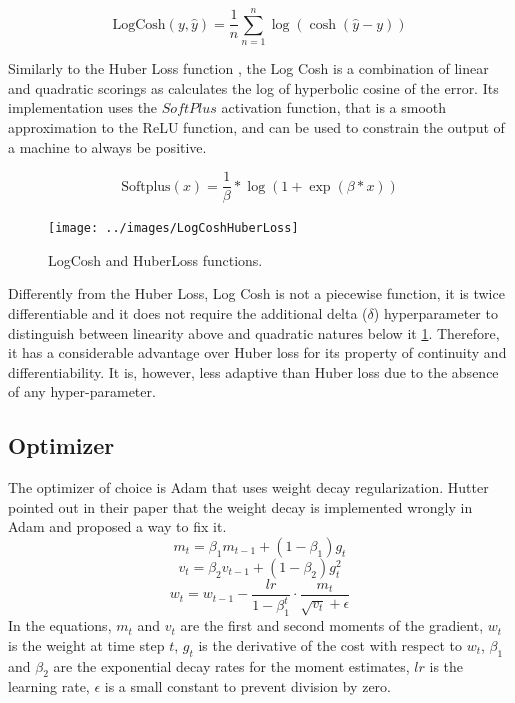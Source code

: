 \begin{equation}
\label{eq:logcosh}
    \text{LogCosh}(y, \hat{y}) = \frac{1}{n} \sum_{n = 1}^{n} \log(\cosh(\hat{y} - y))
\end{equation}

Similarly to the Huber Loss function \cite{huber1964robust}, the Log Cosh is a combination of linear and quadratic scorings as calculates the log of hyperbolic cosine of the error.
Its implementation uses the $SoftPlus$ activation function, that is a smooth approximation to the ReLU function, and can be used to constrain the output of a machine to always be positive.

\begin{equation}
    \label{eq:softplus}
    \text{Softplus}(x) = \frac{1}{\beta} \ast \log(1 + \exp(\beta \ast x))
\end{equation}

\begin{figure}[t!]
    \texttt{[image: ../images/LogCoshHuberLoss]}
    \caption{LogCosh and HuberLoss functions.}
    \label{fig:LogCoshHuberLoss}
    \centering
\end{figure}
Differently from the Huber Loss, Log Cosh is not a piecewise function, it is twice differentiable and it does not require the additional delta ($\delta$) hyperparameter to distinguish between linearity above and quadratic natures below it \ref{fig:LogCoshHuberLoss}.
Therefore, it has a considerable advantage over Huber loss for its property of continuity and differentiability.
It is, however, less adaptive than Huber loss due to the absence of any hyper-parameter.


\subsection{Optimizer}
\label{subsec:optimizer}

The optimizer of choice is Adam \cite{kingma2017adam} that uses weight decay regularization.
Hutter pointed out in their paper \cite{loshchilov2019decoupled} that the weight decay is implemented wrongly in Adam and proposed a way to fix it.
\begin{equation}
\label{eq:first_moment}
m_t = \beta_1 m_{t-1} + (1 - \beta_1) g_t
\end{equation}
\begin{equation}
\label{eq:second_moment}
v_t = \beta_2 v_{t-1} + (1 - \beta_2) g_t^2
\end{equation}
\begin{equation}
\label{eq:weight_update}
w_t = w_{t-1} - \frac{lr}{1 - \beta_1^t} \cdot \frac{m_t}{\sqrt{v_t} + \epsilon}
\end{equation}
In the equations, $m_t$ and $v_t$ are the first and second moments of the gradient, $w_t$ is the weight at time step $t$, $g_t$ is the derivative of the cost with respect to $w_t$, $\beta_1$ and $\beta_2$ are the exponential decay rates for the moment estimates, $lr$ is the learning rate, $\epsilon$ is a small constant to prevent division by zero.